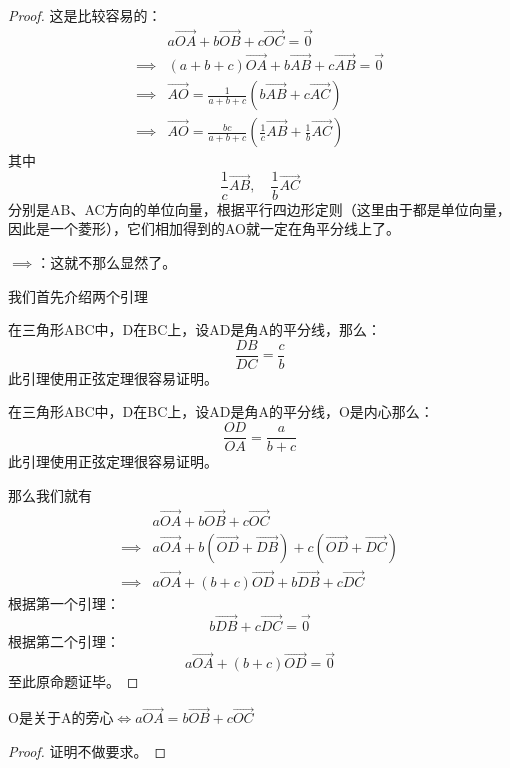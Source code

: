 \begin{proof}
    这是比较容易的：
    $$
        \begin{aligned}
                     & a\overrightarrow{OA} + b\overrightarrow{OB} + c\overrightarrow{OC} = \overrightarrow{0}               \\
            \implies & (a+b+c)\overrightarrow{OA} +b\overrightarrow{AB}+c\overrightarrow{AB} = \overrightarrow{0}            \\
            \implies & \overrightarrow{AO} = \frac{1}{a+b+c}(b\overrightarrow{AB}+c\overrightarrow{AC})                      \\
            \implies & \overrightarrow{AO} = \frac{bc}{a+b+c}(\frac{1}{c}\overrightarrow{AB}+\frac{1}{b}\overrightarrow{AC})
        \end{aligned}
    $$
    其中
    $$
        \frac{1}{c}\overrightarrow{AB}, \quad \frac{1}{b}\overrightarrow{AC}
    $$
    分别是AB、AC方向的单位向量，根据平行四边形定则（这里由于都是单位向量，因此是一个菱形），它们相加得到的AO就一定在角平分线上了。

    $\implies$：这就不那么显然了。

    我们首先介绍两个引理
    \begin{lemma}[角平分线]
        在三角形ABC中，D在BC上，设AD是角A的平分线，那么：
        $$
            \frac{DB}{DC} = \frac{c}{b}
        $$
        此引理使用正弦定理很容易证明。
    \end{lemma}
    \begin{lemma}[内心]
        在三角形ABC中，D在BC上，设AD是角A的平分线，O是内心那么：
        $$
            \frac{OD}{OA} = \frac{a}{b+c}
        $$
        此引理使用正弦定理很容易证明。
    \end{lemma}
    那么我们就有
    $$
        \begin{aligned}
                     & a\overrightarrow{OA} + b\overrightarrow{OB} + c\overrightarrow{OC}                                          \\
            \implies & a\overrightarrow{OA} +b(\overrightarrow{OD}+\overrightarrow{DB})+c(\overrightarrow{OD}+\overrightarrow{DC}) \\
            \implies & a\overrightarrow{OA} + (b+c)\overrightarrow{OD} + b\overrightarrow{DB}+c\overrightarrow{DC}
        \end{aligned}
    $$
    根据第一个引理：
    $$
        b\overrightarrow{DB}+c\overrightarrow{DC} = \overrightarrow{0}
    $$
    根据第二个引理：
    $$
        a\overrightarrow{OA} + (b+c)\overrightarrow{OD} = \overrightarrow{0}
    $$
    至此原命题证毕。
\end{proof}

\begin{theorem}
    O是关于A的旁心$\iff a\overrightarrow{OA} = b\overrightarrow{OB} + c\overrightarrow{OC}$
\end{theorem}

\begin{proof}
    证明不做要求。
\end{proof}